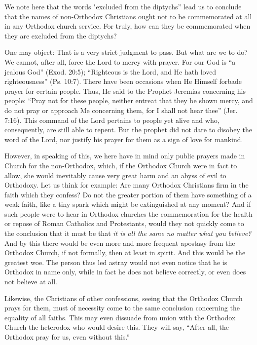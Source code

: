 We note here that the words "excluded from the diptychs” lead us to conclude that the names of non-Orthodox Christians ought not to be commemorated at all in any Orthodox church service. For truly, how can they be commemorated when they are excluded from the diptychs?

One may object: That is a very strict judgment to pass. But what are we to do? We cannot, after all, force the Lord to mercy with prayer. For our God is “a jealous God” (Exod. 20:5); “Righteous is the Lord, and He hath loved righteousness” (Ps. 10:7). There have been occasions when He Himself forbade prayer for certain people. Thus, He said to the Prophet Jeremias concerning his people: “Pray not for these people, neither entreat that they be shown mercy, and do not pray or approach Me concerning them, for I shall not hear thee” (Jer. 7:16). This command of the Lord pertains to people yet alive and who, consequently, are still able to repent. But the prophet did not dare to disobey the word of the Lord, nor justify his prayer for them as a sign of love for mankind.

However, in speaking of this, we here have in mind only public prayers made in Church for the non-Orthodox, which, if the Orthodox Church were in fact to allow, she would inevitably cause very great harm and an abyss of evil to Orthodoxy. Let us think for example: Are many Orthodox Christians firm in the faith which they confess? Do not the greater portion of them have something of a weak faith, like a tiny spark which might be extinguished at any moment? And if such people were to hear in Orthodox churches the commemoration for the health or repose of Roman Catholics and Protestants, would they not quickly come to the conclusion that it must be that \textit{it is all the same no matter what you believe?} And by this there would be even more and more frequent apostasy from the Orthodox Church, if not formally, then at least in spirit. And this would be the greatest woe. The person thus led astray would not even notice that he is Orthodox in name only, while in fact he does not believe correctly, or even does not believe at all.

Likewise, the Christians of other confessions, seeing that the Orthodox Church prays for them, must of necessity come to the same conclusion concerning the equality of all faiths. This may even dissuade from union with the Orthodox Church the heterodox who would desire this. They will say, “After all, the Orthodox pray for us, even without this.”


